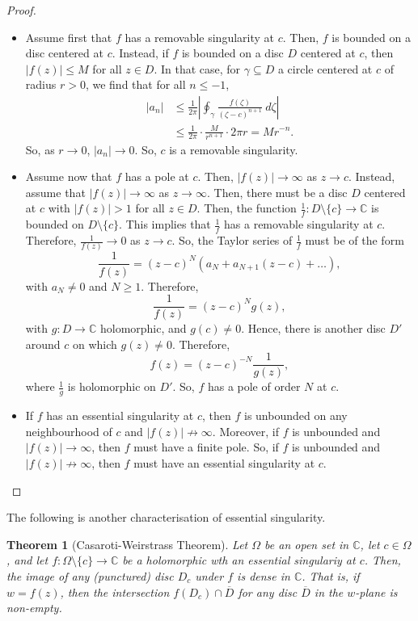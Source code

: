 \documentclass[a4paper, openany]{memoir}
\theoremstyle{definition}
\theoremstyle{plain}
\newtheorem{theorem}[definition]{Theorem}
\begin{document}
\begin{proof}
\hspace*{0pt}
\begin{itemize}
    \item Assume first that $f$ has a removable singularity at $c$. Then, $f$ is bounded on a disc centered at $c$. Instead, if $f$ is bounded on a disc $D$ centered at $c$, then $|f(z)| \leq M$ for all $z \in D$. In that case, for $\gamma \subseteq D$ a circle centered at $c$ of radius $r > 0$, we find that for all $n \leq -1$,
    \begin{align*}
        |a_n| &\leq \frac{1}{2\pi} \left|\oint_\gamma \frac{f(\zeta)}{(\zeta - c)^{n+1}} \ d\zeta \right| \\
        &\leq \frac{1}{2\pi} \cdot \frac{M}{r^{n+1}} \cdot 2\pi r = Mr^{-n}.
    \end{align*}
    So, as $r \to 0$, $|a_n| \to 0$. So, $c$ is a removable singularity.
    
    \item Assume now that $f$ has a pole at $c$. Then, $|f(z)| \to \infty$ as $z \to c$. Instead, assume that $|f(z)| \to \infty$ as $z \to \infty$. Then, there must be a disc $D$ centered at $c$ with $|f(z)| > 1$ for all $z \in D$. Then, the function $\frac{1}{f}: D \setminus \{c\} \to \mathbb{C}$ is bounded on $D \setminus \{c\}$. This implies that $\frac{1}{f}$ has a removable singularity at $c$. Therefore, $\frac{1}{f(z)} \to 0$ as $z \to c$. So, the Taylor series of $\frac{1}{f}$ must be of the form
    \[\frac{1}{f(z)} = (z - c)^N (a_N + a_{N+1} (z - c) + \dots),\]
    with $a_N \neq 0$ and $N \geq 1$. Therefore, 
    \[\frac{1}{f(z)} = (z - c)^N g(z),\]
    with $g: D \to \mathbb{C}$ holomorphic, and $g(c) \neq 0$. Hence, there is another disc $D'$ around $c$ on which $g(z) \neq 0$. Therefore,
    \[f(z) = (z - c)^{-N} \frac{1}{g(z)},\]
    where $\frac{1}{g}$ is holomorphic on $D'$. So, $f$ has a pole of order $N$ at $c$.
    
    \item If $f$ has an essential singularity at $c$, then $f$ is unbounded on any neighbourhood of $c$ and $|f(z)| \not\to \infty$. Moreover, if $f$ is unbounded and $|f(z)| \to \infty$, then $f$ must have a finite pole. So, if $f$ is unbounded and $|f(z)| \not\to \infty$, then $f$ must have an essential singularity at $c$.
\end{itemize}
\end{proof}
The following is another characterisation of essential singularity.
\begin{theorem}[Casaroti-Weirstrass Theorem]
    Let $\Omega$ be an open set in $\mathbb{C}$, let $c \in \Omega$, and let $f: \Omega \setminus \{c\} \to \mathbb{C}$ be a holomorphic wth an essential singulariy at $c$. Then, the image of any (punctured) disc $D_c$ under $f$ is dense in $\mathbb{C}$. That is, if $w = f(z)$, then the intersection $f(D_c) \cap \overline{D}$ for any disc $\overline{D}$ in the $w$-plane is non-empty.
\end{theorem}
\end{document}
